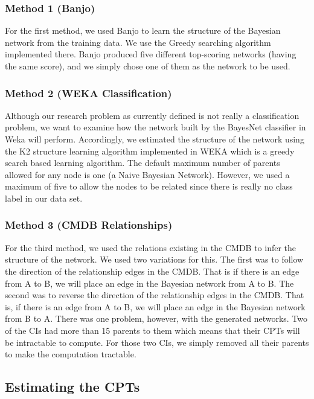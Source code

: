 \documentclass{article}
\begin{document}
\subsubsection{Method 1 (Banjo)}
\label{sec:model1}

For the first method, we used Banjo to learn the structure of the Bayesian network from the training data. We use the Greedy searching algorithm implemented
there. Banjo produced five different top-scoring networks (having the same score), and we simply chose one of them as the network to be used.

\subsubsection{Method 2 (WEKA Classification)}

Although our research problem as currently defined is not really a classification problem, we want to examine how the network built by the BayesNet classifier
in Weka will perform. Accordingly, we estimated the structure of the network using the K2 structure learning algorithm implemented in WEKA which is a greedy
search based learning algorithm. The default maximum number of parents allowed for any node is one (a Naive Bayesian Network). However, we used a maximum of
five to allow the nodes to be related since there is really no class label in our data set.

\subsubsection{Method 3 (CMDB Relationships)}

For the third method, we used the relations existing in the CMDB to infer the structure of the network. We used two
variations for this. The first was to follow the direction of the relationship edges in the CMDB. That is if there is an edge from A to B, we will place an
edge in the Bayesian network from A to B. The second was to reverse the direction of the relationship edges in the CMDB. That is,
if there is an edge from A to B, we will place an edge in the Bayesian network from B to A. There was one problem, however, with
the generated networks. Two of the CIs had more than 15 parents to them which means that their CPTs will be intractable to compute. For those two CIs, we simply
removed all their parents to make the computation tractable.

\subsection{Estimating the CPTs}
\label{sec:cpt}
\end{document}
